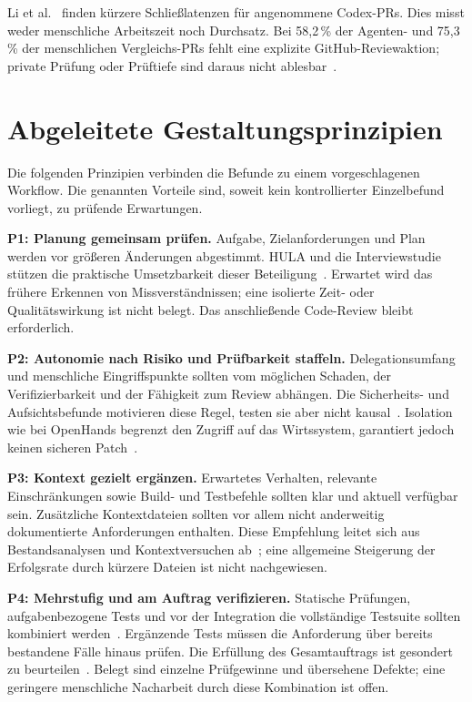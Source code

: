 \documentclass[conference]{IEEEtran}
\begin{document}
Li et al.~\cite{li2025aidev} finden kürzere Schließlatenzen für angenommene Codex-PRs. Dies misst weder menschliche Arbeitszeit noch Durchsatz. Bei 58,2\,\% der Agenten- und 75,3\,\% der menschlichen Vergleichs-PRs fehlt eine explizite GitHub-Reviewaktion; private Prüfung oder Prüftiefe sind daraus nicht ablesbar~\cite{li2025aidev}.

\section{Abgeleitete Gestaltungsprinzipien}
Die folgenden Prinzipien verbinden die Befunde zu einem vorgeschlagenen Workflow. Die genannten Vorteile sind, soweit kein kontrollierter Einzelbefund vorliegt, zu prüfende Erwartungen.

\textbf{P1: Planung gemeinsam prüfen.}
Aufgabe, Zielanforderungen und Plan werden vor größeren Änderungen abgestimmt. HULA und die Interviewstudie stützen die praktische Umsetzbarkeit dieser Beteiligung~\cite{takerngsaksiri2025hula,dhanorkar2026oversight}. Erwartet wird das frühere Erkennen von Missverständnissen; eine isolierte Zeit- oder Qualitätswirkung ist nicht belegt. Das anschließende Code-Review bleibt erforderlich.

\textbf{P2: Autonomie nach Risiko und Prüfbarkeit staffeln.}
Delegationsumfang und menschliche Eingriffspunkte sollten vom möglichen Schaden, der Verifizierbarkeit und der Fähigkeit zum Review abhängen. Die Sicherheits- und Aufsichtsbefunde motivieren diese Regel, testen sie aber nicht kausal~\cite{sajadi2025patchsecurity,dhanorkar2026oversight}. Isolation wie bei OpenHands begrenzt den Zugriff auf das Wirtssystem, garantiert jedoch keinen sicheren Patch~\cite{wang2025openhands}.

\textbf{P3: Kontext gezielt ergänzen.}
Erwartetes Verhalten, relevante Einschränkungen sowie Build- und Testbefehle sollten klar und aktuell verfügbar sein. Zusätzliche Kontextdateien sollten vor allem nicht anderweitig dokumentierte Anforderungen enthalten. Diese Empfehlung leitet sich aus Bestandsanalysen und Kontextversuchen ab~\cite{mohsenimofidi2026context,gloaguen2026agentsmd}; eine allgemeine Steigerung der Erfolgsrate durch kürzere Dateien ist nicht nachgewiesen.

\textbf{P4: Mehrstufig und am Auftrag verifizieren.}
Statische Prüfungen, aufgabenbezogene Tests und vor der Integration die vollständige Testsuite sollten kombiniert werden~\cite{yang2024sweagent,wang2026solvedissues}. Ergänzende Tests müssen die Anforderung über bereits bestandene Fälle hinaus prüfen. Die Erfüllung des Gesamtauftrags ist gesondert zu beurteilen~\cite{cemri2025mast}. Belegt sind einzelne Prüfgewinne und übersehene Defekte; eine geringere menschliche Nacharbeit durch diese Kombination ist offen.
\end{document}
